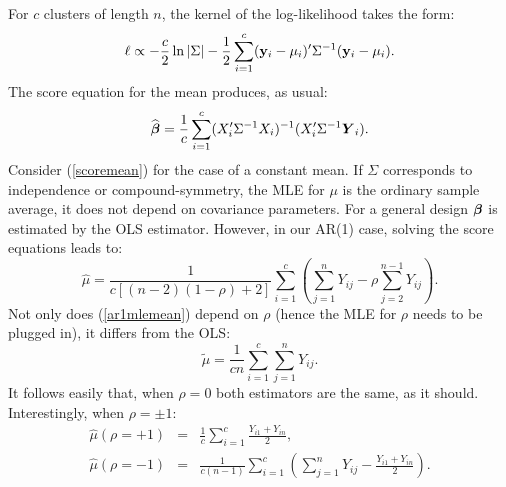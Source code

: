 \documentclass[11pt,a5paper,twoside]{book}
\newcommand{\BY}{\mbox{\boldmath $Y$}}
\newcommand{\by}{{\bf y}}
\newcommand{\bfbeta}{\mbox{\boldmath $\beta$}}
\begin{document}
For $c$ clusters of length $n$, the kernel of the log-likelihood takes the form:
\begin{equation}
\ell\propto -\frac{c}{2}\ln|\Sigma|-\frac{1}{2}\sum_{i=1}^c(\by_i-\mathbf{\mu}_i)'\Sigma^{-1}(\by_i-\mathbf{\mu}_i).\label{ar1loglik}
\end{equation}
The score equation for the mean produces, as usual:
\begin{equation}
\label{scoremean}
\widehat{\bfbeta}=\frac{1}{c}\sum_{i=1}^c(X_i'\Sigma^{-1}X_i)^{-1}(X_i'\Sigma^{-1}\BY_i).
\end{equation}
Consider (\ref{scoremean}) for the case of a constant mean. If $\Sigma$ corresponds to independence or compound-symmetry, the MLE for $\mu$ is the ordinary sample average, it does not depend on covariance parameters. For a general design $\bfbeta$ is estimated by the OLS estimator. However, in our AR(1) case, solving the score equations leads to:
\begin{equation}
\widehat{\mu}=\frac{1}{c[(n-2)(1-\rho)+2]}\sum_{i=1}^c\left(
\sum_{j=1}^nY_{ij}-\rho\sum_{j=2}^{n-1}Y_{ij}
\right).
\label{ar1mlemean}
\end{equation}
Not only does (\ref{ar1mlemean}) depend on $\rho$ (hence the MLE for $\rho$ needs to be plugged in), it differs from the OLS:
\begin{equation}
\widetilde{\mu}=\frac{1}{cn}\sum_{i=1}^c\sum_{j=1}^nY_{ij}.
\label{ar1olsmean}
\end{equation}
It follows easily that, when $\rho=0$ both estimators are the same, as it should. Interestingly, when $\rho=\pm1$:
\begin{eqnarray}
\widehat{\mu}(\rho=+1)&=&\frac{1}{c}\sum_{i=1}^c\frac{Y_{i1}+Y_{in}}{2},\\
\widehat{\mu}(\rho=-1)&=&\frac{1}{c(n-1)}\sum_{i=1}^c\left(\sum_{j=1}^nY_{ij}-\frac{Y_{i1}+Y_{in}}{2}\right).
\end{eqnarray}
\end{document}
